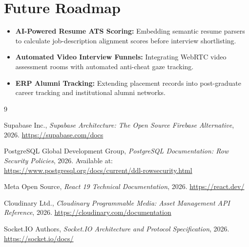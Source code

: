 \documentclass[12pt,a4paper]{report}
\begin{document}
\section{Future Roadmap}
\begin{itemize}
    \item \textbf{AI-Powered Resume ATS Scoring:} Embedding semantic resume parsers to calculate job-description alignment scores before interview shortlisting.
    \item \textbf{Automated Video Interview Funnels:} Integrating WebRTC video assessment rooms with automated anti-cheat gaze tracking.
    \item \textbf{ERP Alumni Tracking:} Extending placement records into post-graduate career tracking and institutional alumni networks.
\end{itemize}

\cleardoublepage
\begin{thebibliography}{9}

Supabase Inc., \textit{Supabase Architecture: The Open Source Firebase Alternative}, 2026. \url{https://supabase.com/docs}

PostgreSQL Global Development Group, \textit{PostgreSQL Documentation: Row Security Policies}, 2026. Available at: \url{https://www.postgresql.org/docs/current/ddl-rowsecurity.html}

Meta Open Source, \textit{React 19 Technical Documentation}, 2026. \url{https://react.dev/}

Cloudinary Ltd., \textit{Cloudinary Programmable Media: Asset Management API Reference}, 2026. \url{https://cloudinary.com/documentation}

Socket.IO Authors, \textit{Socket.IO Architecture and Protocol Specification}, 2026. \url{https://socket.io/docs/}

\end{thebibliography}
\end{document}
